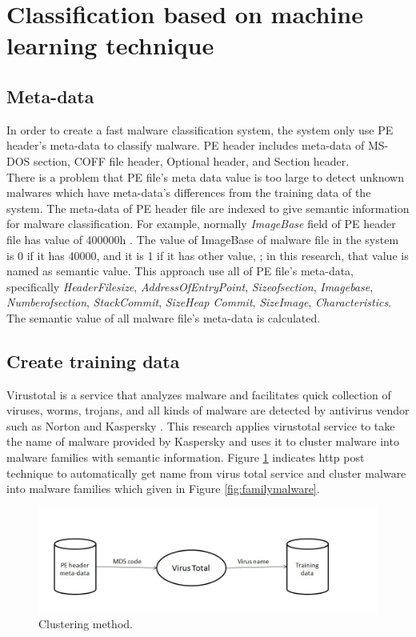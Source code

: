 \section{Classification based on machine learning technique} 
\subsection{Meta-data}
In order to create a fast malware classification system, the system only use PE header's meta-data to classify malware. PE header includes meta-data of MS-DOS section, COFF file header, Optional header, and Section header.\\
There is a problem that PE file's meta data value is too large to detect unknown malwares which have meta-data's differences from the training data of the system. The meta-data of PE header file are indexed to give semantic information for malware classification. For example, normally \emph{ImageBase} field of PE header file has value of 400000h \cite{goppit}. The value of ImageBase of malware file in the system is 0 if it has 40000, and it is 1 if it has other value, ; in this research, that value is named as semantic value. This approach use all of PE file's meta-data, specifically \emph{HeaderFilesize}, \emph{AddressOfEntryPoint}, \emph{Sizeofsection}, \emph{Imagebase}, \emph{Numberofsection}, \emph{StackCommit}, \emph{SizeHeap Commit}, \emph{SizeImage}, \emph{Characteristics}. The semantic value of all malware file's meta-data is calculated.

\subsection{Create training data}
Virustotal is a service that analyzes malware and facilitates quick collection of viruses, worms, trojans, and all kinds of malware are detected by antivirus vendor such as Norton and Kaspersky \cite{virustotal}. This research applies virustotal service to take the name of malware provided by Kaspersky and uses it to  cluster malware into malware families with semantic information. 
Figure \ref{fig:clustering} indicates http post technique to automatically get name from virus total service and cluster malware into malware families which given in Figure \ref{fig:familymalware}.
\begin{figure}[h!]
\centering
\includegraphics[width=1\textwidth]{graph/clustering.jpg}
\caption{Clustering method.}
\label{fig:clustering}
\end{figure}
\newline

